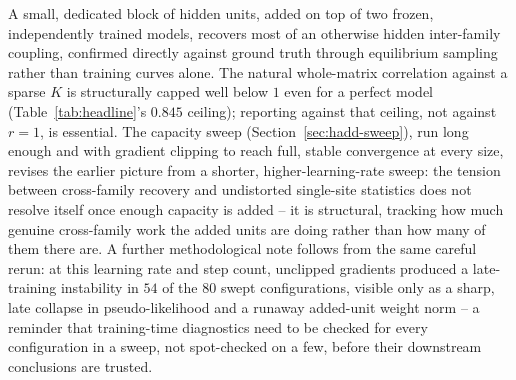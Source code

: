 \documentclass[11pt]{article}
\begin{document}
A small, dedicated block of hidden units, added on top of two frozen,
independently trained models, recovers most of an otherwise hidden
inter-family coupling, confirmed directly against ground truth through
equilibrium sampling rather than training curves alone. The natural
whole-matrix correlation against a sparse $K$ is structurally capped well
below $1$ even for a perfect model (Table~\ref{tab:headline}'s
$0.845$ ceiling); reporting against that ceiling, not against $r=1$, is
essential. The capacity sweep (Section~\ref{sec:hadd-sweep}), run long
enough and with gradient clipping to reach full, stable convergence at
every size, revises the earlier picture from a shorter, higher-learning-rate
sweep: the tension between cross-family recovery and undistorted
single-site statistics does not resolve itself once enough capacity is
added -- it is structural, tracking how much genuine cross-family work the
added units are doing rather than how many of them there are. A further
methodological note follows from the same careful rerun: at this learning
rate and step count, unclipped gradients produced a late-training
instability in $54$ of the $80$ swept configurations, visible only as a
sharp, late collapse in pseudo-likelihood and a runaway added-unit weight
norm -- a reminder that training-time diagnostics need to be checked for
every configuration in a sweep, not spot-checked on a few, before their
downstream conclusions are trusted.
\end{document}
